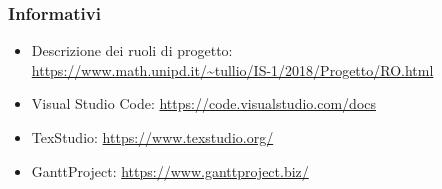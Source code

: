     \subsubsection{Informativi}	\label{rifinfo}
    \begin{itemize}
        \item Descrizione dei ruoli di progetto: \\\url{https://www.math.unipd.it/~tullio/IS-1/2018/Progetto/RO.html}
        \item Visual Studio Code: \url{https://code.visualstudio.com/docs}
        \item TexStudio: \url{https://www.texstudio.org/}
        \item GanttProject: \url{https://www.ganttproject.biz/}
	\end{itemize}
